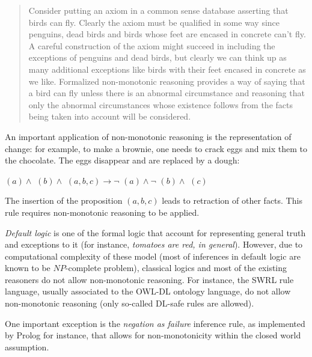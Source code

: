 \begin{quotation}
Consider putting an axiom in a common sense database asserting that birds can
fly. Clearly the axiom must be qualified in some way since penguins, dead birds
and birds whose feet are encased in concrete can't fly. A careful construction
of the axiom might succeed in including the exceptions of penguins and dead
birds, but clearly we can think up as many additional exceptions like birds
with their feet encased in concrete as we like. Formalized non-monotonic
reasoning provides a way of saying that a bird can fly unless there
is an abnormal circumstance and reasoning that only the abnormal circumstances
whose existence follows from the facts being taken into account will be
considered.
\end{quotation}

An important application of non-monotonic reasoning is the representation of
change: for example, to make a brownie, one needs to crack eggs and mix them to the chocolate.
The eggs disappear and are replaced by a dough:

$(a) \land $  $(b) \land $
$(a, b, c) \to \lnot $ $(a) \land \lnot $
$(b) \land $ $(c)$

The insertion of the proposition $(a, b, c)$ leads to
retraction of other facts. This rule requires non-monotonic reasoning to be
applied.

\emph{Default logic} is one of the formal logic that account for representing
general truth and exceptions to it (for instance, \emph{tomatoes are red, in
general}). However, due to computational complexity of these model (most of
inferences in default logic are known to be $NP$-complete problem), classical
logics and most of the existing reasoners do not allow non-monotonic reasoning.
For instance, the SWRL rule language, usually associated to the OWL-DL ontology
language, do not allow non-monotonic reasoning (only so-called DL-safe rules
are allowed).


One important exception is the \emph{negation as failure} inference rule, as
implemented by {\sc Prolog} for instance, that allows for non-monotonicity
within the closed world assumption.



